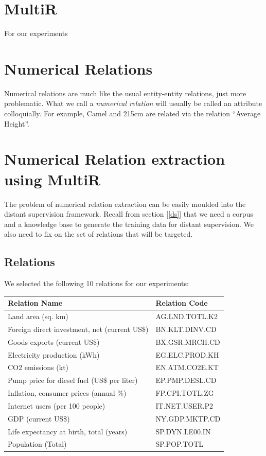\documentclass[a4paper,10pt]{article}
\begin{document}
\section{MultiR}
For our experiments
\section{Numerical Relations}
Numerical relations are much like the usual entity-entity relations, just more problematic.
What we call a \emph{numerical relation} will usually be called an attribute colloquially. 
For example, Camel and 215cm are related via the relation ``Average Height''.

\section{Numerical Relation extraction using MultiR}
The problem of numerical relation extraction can be easily moulded into the distant supervision framework.
Recall from section [\ref{ds}] that we need a corpus and a knowledge base to generate the training data for distant supervision.
We also need to fix on the set of relations that will be targeted. 

\subsection{Relations}
We selected the following 10 relations for our experiments:
 \begin{center}
\begin{tabular}{|l|l|}
\hline
Relation Name & Relation Code \\
\hline
Land area (sq. km)&AG.LND.TOTL.K2\\
Foreign direct investment, net (current US\$)&BN.KLT.DINV.CD\\
Goods exports (current US\$)&BX.GSR.MRCH.CD\\
Electricity production (kWh)&EG.ELC.PROD.KH\\
CO2 emissions (kt)&EN.ATM.CO2E.KT\\
Pump price for diesel fuel (US\$ per liter)&EP.PMP.DESL.CD\\
Inflation, consumer prices (annual \%)&FP.CPI.TOTL.ZG\\
Internet users (per 100 people)&IT.NET.USER.P2\\
GDP (current US\$)&NY.GDP.MKTP.CD\\
Life expectancy at birth, total (years)&SP.DYN.LE00.IN\\
Population (Total)&SP.POP.TOTL\\
\hline
\end{tabular}
\end{center}
\end{document}
